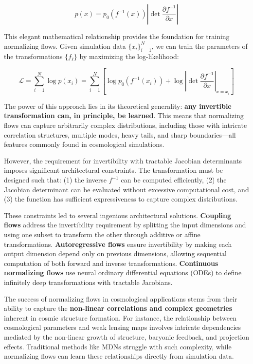 \documentclass{SciPost}
\begin{document}
\begin{equation}
    p(x) = p_0(f^{-1}(x)) \left| \det \frac{\partial f^{-1}}{\partial x} \right|
\end{equation}

This elegant mathematical relationship provides the foundation for training normalizing flows. Given simulation data $\{x_i\}_{i=1}^N$, we can train the parameters of the transformations $\{f_\ell\}$ by maximizing the log-likelihood:

\begin{equation}
    \mathcal{L} = \sum_{i=1}^N \log p(x_i) = \sum_{i=1}^N \left[ \log p_0(f^{-1}(x_i)) + \log \left| \det \frac{\partial f^{-1}}{\partial x} \right|_{x=x_i} \right]
\end{equation}

The power of this approach lies in its theoretical generality: \textbf{any invertible transformation can, in principle, be learned}. This means that normalizing flows can capture arbitrarily complex distributions, including those with intricate correlation structures, multiple modes, heavy tails, and sharp boundaries—all features commonly found in cosmological simulations.

However, the requirement for invertibility with tractable Jacobian determinants imposes significant architectural constraints. The transformation must be designed such that: (1) the inverse $f^{-1}$ can be computed efficiently, (2) the Jacobian determinant can be evaluated without excessive computational cost, and (3) the function has sufficient expressiveness to capture complex distributions.

These constraints led to several ingenious architectural solutions. \textbf{Coupling flows} address the invertibility requirement by splitting the input dimensions and using one subset to transform the other through additive or affine transformations. \textbf{Autoregressive flows} ensure invertibility by making each output dimension depend only on previous dimensions, allowing sequential computation of both forward and inverse transformations. \textbf{Continuous normalizing flows} use neural ordinary differential equations (ODEs) to define infinitely deep transformations with tractable Jacobians.

The success of normalizing flows in cosmological applications stems from their ability to capture the \textbf{non-linear correlations and complex geometries} inherent in cosmic structure formation. For instance, the relationship between cosmological parameters and weak lensing maps involves intricate dependencies mediated by the non-linear growth of structure, baryonic feedback, and projection effects. Traditional methods like MDNs struggle with such complexity, while normalizing flows can learn these relationships directly from simulation data.
\end{document}

